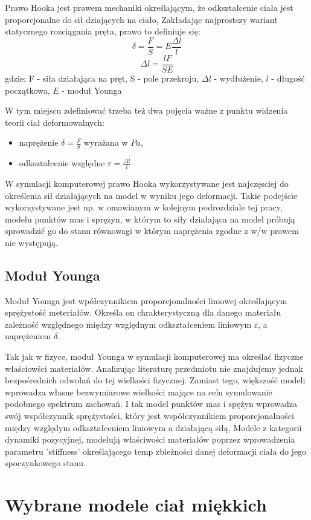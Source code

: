 Prawo Hooka jest prawem mechaniki określającym, że odkształcenie ciała jest
proporcjonalne do sił dziających na ciało,
Zakładając najprostszy wariant statycznego rozciągania pręta, prawo to definiuje
się:
$$\delta = \frac{F}{S} = E\frac{\Delta l}{l}$$
$$\Delta l = \frac{lF}{SE}$$
gdzie:
F - siła działająca na pręt,
S - pole przekroju,
$\Delta l$ - wydłużenie,
$l$ - długość początkowa,
$E$ - moduł Younga

W tym miejscu zdefiniować trzeba też dwa pojęcia ważne z punktu widzenia teorii
ciał deformowalnych:
\begin{itemize}
\item naprężenie $\delta = \frac{F}{S}$ wyrażana w $Pa$,
\item odkształcenie względne $\varepsilon = \frac{\Delta l}{l}$
\end{itemize}
 
W symulacji komputerowej prawo Hooka wykorzystywane jest najczęsciej do określenia sił
działających na model w wyniku jego deformacji. Takie podejście wykorzystywane
jest np. w omawianym w kolejnym podrozdziale tej pracy, modelu punktów mas i
sprężyn, w którym to siły działająca na model próbują sprowadzić go do stanu
równowagi w którym naprężenia zgodne z w/w prawem nie występują.

\subsection{Moduł Younga}
Moduł Younga jest wpółczynnikiem proporcjonalności liniowej określającym
sprężystość meteriałów. Określa on chrakterystyczną dla danego materiału
zależność względnego między względnym odkształceniem liniowym $\varepsilon$, a
naprężeniem $\delta$.

Tak jak w fizyce, moduł Younga w symulacji komputerowej ma określać fizyczne
właściowści materiałów. Analizując literaturę przedmiotu nie znajdujemy jednak 
bezpośrednich odwołań do tej wielkości fizycznej. Zamiast tego, większość modeli wprowadza
własne bezwymiarowe wielkości mające na celu symulowanie podobnego spektrum
zachowań. I tak model punktów mas i spężyn wprowadza swój współczynnik
sprężystości, który jest współczynnikiem proporcjonalności między względym
odkształceniem liniowym a działającą siłą. Modele z kategorii dynamiki
pozycyjnej, modelują właściwości materiałów poprzez wprowadzenia parametru
'stiffness' określającego temp zbieżności danej deformacji ciała do jego
spoczynkowego stanu.

\section{Wybrane modele ciał miękkich}


